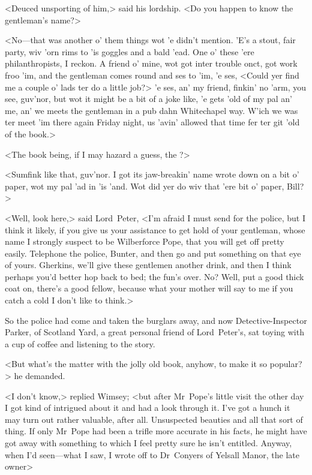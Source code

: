 <Deuced unsporting of him,> said his lordship. <Do you happen to know the gentleman's name?>

<No—that was another o' them things wot 'e didn't mention. 'E's a stout, fair party, wiv 'orn rims to 'is goggles and a bald 'ead. One o' these 'ere philanthropists, I reckon. A friend o' mine, wot got inter trouble onct, got work froo 'im, and the gentleman comes round and ses to 'im, 'e ses, <Could yer find me a couple o' lads ter do a little job?> 'e ses, an' my friend, finkin' no 'arm, you see, guv'nor, but wot it might be a bit of a joke like, 'e gets 'old of my pal an' me, an' we meets the gentleman in a pub dahn Whitechapel way. W'ich we was ter meet 'im there again Friday night, us 'avin' allowed that time fer ter git 'old of the book.>

<The book being, if I may hazard a guess, the ?>

<Sumfink like that, guv'nor. I got its jaw-breakin' name wrote down on a bit o' paper, wot my pal 'ad in 'is 'and. Wot did yer do wiv that 'ere bit o' paper, Bill?>

<Well, look here,> said Lord~Peter, <I'm afraid I must send for the police, but I think it likely, if you give us your assistance to get hold of your gentleman, whose name I strongly suspect to be Wilberforce Pope, that you will get off pretty easily. Telephone the police, Bunter, and then go and put something on that eye of yours. Gherkins, we'll give these gentlemen another drink, and then I think perhaps you'd better hop back to bed; the fun's over. No? Well, put a good thick coat on, there's a good fellow, because what your mother will say to me if you catch a cold I don't like to think.>

So the police had come and taken the burglars away, and now Detective-Inspector Parker, of Scotland Yard, a great personal friend of Lord~Peter's, sat toying with a cup of coffee and listening to the story.

<But what's the matter with the jolly old book, anyhow, to make it so popular?> he demanded.

<I don't know,> replied Wimsey; <but after Mr~Pope's little visit the other day I got kind of intrigued about it and had a look through it. I've got a hunch it may turn out rather valuable, after all. Unsuspected beauties and all that sort of thing. If only Mr~Pope had been a trifle more accurate in his facts, he might have got away with something to which I feel pretty sure he isn't entitled. Anyway, when I'd seen—what I saw, I wrote off to Dr~Conyers of Yelsall Manor, the late owner\longdash>


